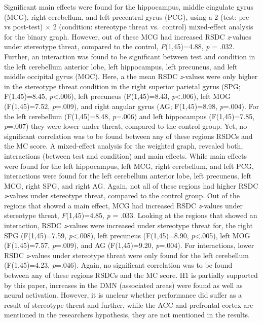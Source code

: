 \documentclass[
  stu,floatsintext]{apa7}
\begin{document}
Significant main effects were found for the hippocampus, middle cingulate gyrus (MCG), right cerebellum, and left precentral gyrus (PCG), using a 2 (test: pre- vs post-test) \(\times\) 2 (condition: stereotype threat vs.~control) mixed-effect analysis for the binary graph.
However, out of these MCG had increased RSDC \emph{z}-values under stereotype threat, compared to the control, \emph{F}(1,45)=4.88, \emph{p} = .032.
Further, an interaction was found to be significant between test and condition in the left cerebellum anterior lobe, left hippocampus, left precuneus, and left middle occipital gyrus (MOC).
Here, a the mean RSDC \emph{z}-values were only higher in the stereotype threat condition in the right superior parietal gyrus (SPG; F(1,45)=8.45, \emph{p}\textless.006), left precuneus (F(1,45)=8.43, \emph{p}\textless.006), left MOG (F(1,45)=7.52, \emph{p}=.009), and right angular gyrus (AG; F(1,45)=8.98, \emph{p}=.004).
For the left cerebellum (F(1,45)=8.48, \emph{p}=.006) and left hippocampus (F(1,45)=7.85, \emph{p}=.007) they were lower under threat, compared to the control group.
Yet, no significant correlation was to be found between any of these regions RSDCs and the MC score.
A mixed-effect analysis for the weighted graph, revealed both, interactions (between test and condition) and main effects.
While main effects were found for the left hippocampus, left MCG, right cerebellum, and left PCG, interactions were found for the left cerebellum anterior lobe, left precuneus, left MCG, right SPG, and right AG.
Again, not all of these regions had higher RSDC \emph{z}-values under stereotype threat, compared to the control group.
Out of the regions that showed a main effect, MCG had increased RSDC \emph{z}-values under stereotype threat, \emph{F}(1,45)=4.85, \emph{p} = .033.
Looking at the regions that showed an interaction, RSDC \emph{z}-values were increased under stereotype threat for, the right SPG (F(1,45)=7.59, \emph{p}\textless.008), left precuneus (F(1,45)=8.90, \emph{p}\textless.005), left MOG (F(1,45)=7.57, \emph{p}=.009), and AG (F(1,45)=9.20, \emph{p}=.004).
For interactions, lower RSDC \emph{z}-values under stereotype threat were only found for the left cerebellum (F(1,45)=4.23, \emph{p}=.046).
Again, no significant correlation was to be found between any of these regions RSDCs and the MC score.
H1 is partially supported by this paper, increases in the DMN (associated areas) were found as well as neural activation. However, it is unclear whether performance did suffer as a result of stereotype threat and further, while the ACC and prefrontal cortex are mentioned in the researchers hypothesis, they are not mentioned in the results.
\end{document}
